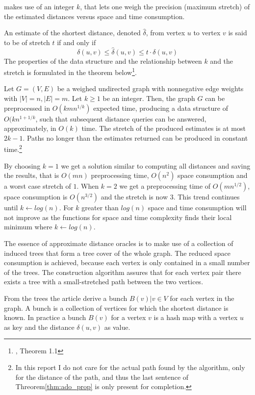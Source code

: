  makes use of an integer $k$, that lets one weigh the precision
(maximum stretch) of the estimated distances versus space and time consumption.

An estimate of the shortest distance, denoted $\hat{\delta}$, from vertex $u$
to vertex $v$ is said to be of stretch $t$ if and only if
\begin{equation}
    \delta(u,v) \leq \hat{\delta}(u,v) \leq t \cdot \delta(u,v)
    \label{eq:stretchinterval}
\end{equation}
The properties of the data structure and the relationship between $k$ and the
stretch is formulated in the theorem below\footnote{\cite{tu}, Theorem 1.1}.
\begin{thm}
    Let $G=(V,E)$ be a weighed undirected graph with nonnegative edge weights
    with $|V|=n, |E|=m$. Let $k \geq 1$ be an integer. Then, the graph $G$
    can be preprocessed in $O(kmn^{1/k})$ expected time, producing a data
    structure of $O(kn^{1+1/k}$, such that subsequent distance queries can
    be answered, approximately, in $O(k)$ time. The stretch of the produced
    estimates is at most $2k-1$. Paths no longer than the estimates returned
    can be produced in constant time.\footnote{In this report I do not care
    for the actual path found by the algorithm, only for the distance of
    the path, and thus the last sentence of Threorem\autoref{thm:ado_prop} is
    only present for completion.}
    \label{thm:ado_prop}
\end{thm}
By choosing $k=1$ we get a solution similar to computing all distances
and saving the results, that is $O(mn)$ preprocessing time, $O(n^2)$ space
consumption and a worst case stretch of $1$. When $k=2$ we get a
preprocessing time of $O(mn^{1/2})$, space consumption is $O(n^{3/2})$ and
the stretch is now $3$. This trend continues until $k \gets log(n)$. For $k$
greater than $log(n)$ space and time consumption will not improve as the
functions for space and time complexity finds their local minimum where $k
\gets log(n)$.

The essence of approximate distance oracles is to make use of a collection of
induced trees that form a tree cover of the whole graph. The reduced space
consumption is achieved, because each vertex is only contained in a small
number of the trees. The construction algorithm assures that for each vertex
pair there exists a tree with a small-stretched path between the two vertices.

From the trees the article derive a bunch $B(v) | v \in V$ for each vertex in
the graph. A bunch is a collection of vertices for which the shortest distance
is known. In practice a bunch $B(v)$ for a vertex $v$ is a hash map with a
vertex $u$ as key and the distance $\delta(u,v)$ as value.

